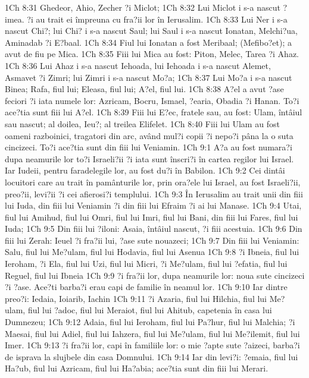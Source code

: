 1Ch 8:31  Ghedeor, Ahio, Zecher ?i Miclot;
1Ch 8:32  Lui Miclot i s-a nascut ?imea. ?i au trait ei împreuna cu fra?ii lor în Ierusalim.
1Ch 8:33  Lui Ner i s-a nascut Chi?; lui Chi? i s-a nascut Saul; lui Saul i s-a nascut Ionatan, Melchi?ua, Aminadab ?i E?baal.
1Ch 8:34  Fiul lui Ionatan a fost Meribaal; (Mefibo?et); a avut de fiu pe Mica.
1Ch 8:35  Fiii lui Mica au fost: Piton, Melec, Tarea ?i Ahaz.
1Ch 8:36  Lui Ahaz i s-a nascut Iehoada, lui Iehoada i s-a nascut Alemet, Asmavet ?i Zimri; lui Zimri i s-a nascut Mo?a;
1Ch 8:37  Lui Mo?a i s-a nascut Binea; Rafa, fiul lui; Eleasa, fiul lui; A?el, fiul lui.
1Ch 8:38  A?el a avut ?ase feciori ?i iata numele lor: Azricam, Bocru, Ismael, ?earia, Obadia ?i Hanan. To?i ace?tia sunt fiii lui A?el.
1Ch 8:39  Fiii lui E?ec, fratele sau, au fost: Ulam, întâiul sau nascut; al doilea, Ieu?; al treilea Elifelet.
1Ch 8:40  Fiii lui Ulam au fost oameni razboinici, tragatori din arc, având mul?i copii ?i nepo?i pâna la o suta cincizeci. To?i ace?tia sunt din fiii lui Veniamin.
1Ch 9:1  A?a au fost numara?i dupa neamurile lor to?i Israeli?ii ?i iata sunt înscri?i în cartea regilor lui Israel. Iar Iudeii, pentru faradelegile lor, au fost du?i în Babilon.
1Ch 9:2  Cei dintâi locuitori care au trait în pamânturile lor, prin ora?ele lui Israel, au fost Israeli?ii, preo?ii, levi?ii ?i cei afierosi?i templului.
1Ch 9:3  În Ierusalim au trait unii din fiii lui Iuda, din fiii lui Veniamin ?i din fiii lui Efraim ?i ai lui Manase.
1Ch 9:4  Utai, fiul lui Amihud, fiul lui Omri, fiul lui Imri, fiul lui Bani, din fiii lui Fares, fiul lui Iuda;
1Ch 9:5  Din fiii lui ?iloni: Asaia, întâiul nascut, ?i fiii acestuia.
1Ch 9:6  Din fiii lui Zerah: Ieuel ?i fra?ii lui, ?ase sute nouazeci;
1Ch 9:7  Din fiii lui Veniamin: Salu, fiul lui Me?ulam, fiul lui Hodavia, fiul lui Asenua
1Ch 9:8  ?i Ibneia, fiul lui Ieroham, ?i Ela, fiul lui Uzi, fiul lui Micri, ?i Me?ulam, fiul lui ?efatia, fiul lui Reguel, fiul lui Ibneia
1Ch 9:9  ?i fra?ii lor, dupa neamurile lor: noua sute cincizeci ?i ?ase. Ace?ti barba?i erau capi de familie în neamul lor.
1Ch 9:10  Iar dintre preo?i: Iedaia, Ioiarib, Iachin
1Ch 9:11  ?i Azaria, fiul lui Hilchia, fiul lui Me?ulam, fiul lui ?adoc, fiul lui Meraiot, fiul lui Ahitub, capetenia în casa lui Dumnezeu;
1Ch 9:12  Adaia, fiul lui Ieroham, fiul lui Pa?hur, fiul lui Malchia; ?i Maesai, fiul lui Adiel, fiul lui Iahzera, fiul lui Me?ulam, fiul lui Me?ilemit, fiul lui Imer.
1Ch 9:13  ?i fra?ii lor, capi în familiile lor: o mie ?apte sute ?aizeci, barba?i de isprava la slujbele din casa Domnului.
1Ch 9:14  Iar din levi?i: ?emaia, fiul lui Ha?ub, fiul lui Azricam, fiul lui Ha?abia; ace?tia sunt din fiii lui Merari.
